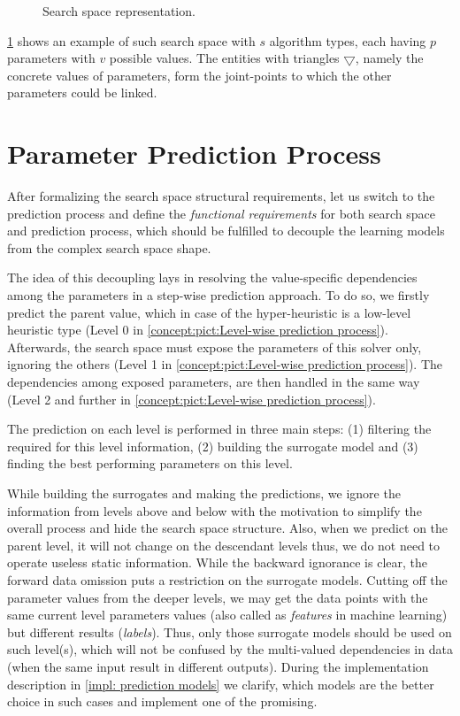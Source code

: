 \begin{figure}
	\centering
	
	\caption{Search space representation.}
	\label{concept:pict:Search Space Representation}
\end{figure}

\cref{concept:pict:Search Space Representation} shows an example of such search space with $s$ algorithm types, each having $p$ parameters with $v$ possible values. The entities with triangles $\bigtriangledown$, namely the concrete values of parameters, form the joint-points to which the other parameters could be linked. 


\section{Parameter Prediction Process}\label{concept:prediction}
After formalizing the search space structural requirements, let us switch to the prediction process and define the  \emph{functional requirements} for both search space and prediction process, which should be fulfilled to decouple the learning models from the complex search space shape.

The idea of this decoupling lays in resolving the value-specific dependencies among the parameters in a step-wise prediction approach. To do so, we firstly predict the parent value, which in case of the hyper-heuristic is a low-level heuristic type (Level 0 in \cref{concept:pict:Level-wise prediction process}). Afterwards, the search space must expose the parameters of this solver only, ignoring the others (Level 1 in \cref{concept:pict:Level-wise prediction process}). The dependencies among exposed parameters, are then handled in the same way (Level 2 and further in \cref{concept:pict:Level-wise prediction process}).

The prediction on each level is performed in three main steps: (1) filtering the required for this level information, (2) building the surrogate model and (3) finding the best performing parameters on this level.

While building the surrogates and making the predictions, we ignore the information from levels above and below with the motivation to simplify the overall process and hide the search space structure. Also, when we predict on the parent level, it will not change on the descendant levels thus, we do not need to operate useless static information. While the backward ignorance is clear, the forward data omission puts a restriction on the surrogate models. Cutting off the parameter values from the deeper levels, we may get the data points with the same current level parameters values (also called as \emph{features} in machine learning) but different results (\emph{labels}). Thus, only those surrogate models should be used on such level(s), which will not be confused by the multi-valued dependencies in data (when the same input result in different outputs). During the implementation description in \cref{impl: prediction models} we clarify, which models are the better choice in such cases and implement one of the promising.

